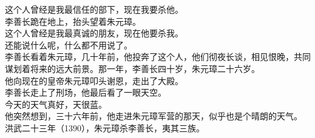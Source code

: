 \begin{multicols}{\theparacolNo}
这个人曾经是我最信任的部下，现在我要杀他。\\

李善长跪在地上，抬头望着朱元璋。\\

这个人曾经是我最真诚的朋友，现在他要杀我。\\

还能说什么呢，什么都不用说了。\\

李善长看着朱元璋，几十年前，他投奔了这个人，他们彻夜长谈，相见恨晚，共同谋划着将来的远大前景。那一年，李善长四十岁，朱元璋二十六岁。\\

他向现在的皇帝朱元璋叩头谢恩，走出了大殿。\\

李善长走上了刑场，他最后看了一眼天空。\\

今天的天气真好，天很蓝。\\

他突然想到，三十六年前，他走进朱元璋军营的那天，似乎也是个晴朗的天气。\\

洪武二十三年（1390），朱元璋杀李善长，夷其三族。\\
\ifnum{}
	\end{multicols}
\fi
\newpage
